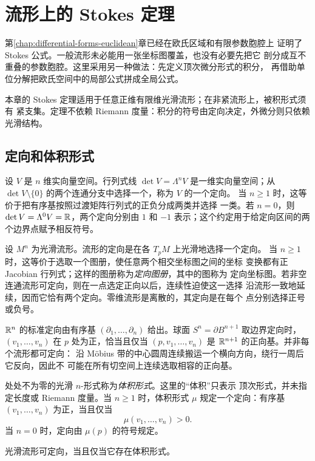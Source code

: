 \chapter{流形上的 Stokes 定理}
\label{chap:stokes-manifolds}

第\ref{chap:differential-forms-euclidean}章已经在欧氏区域和有限参数胞腔上
证明了 Stokes 公式。一般流形未必能用一张坐标图覆盖，也没有必要先把它
剖分成互不重叠的参数胞腔。这里采用另一种做法：先定义顶次微分形式的积分，
再借助单位分解把欧氏空间中的局部公式拼成全局公式。

本章的 Stokes 定理适用于任意正维有限维光滑流形；在非紧流形上，被积形式须有
紧支集。定理不依赖 Riemann 度量：积分的符号由定向决定，外微分则只依赖
光滑结构。

\section{定向和体积形式}

设 $V$ 是 $n$ 维实向量空间。行列式线
$\det V=\Lambda^nV$ 是一维实向量空间；从
$\det V\setminus\{0\}$ 的两个连通分支中选择一个，称为 $V$ 的一个定向。
当 $n\ge1$ 时，这等价于把有序基按照过渡矩阵行列式的正负分成两类并选择
一类。若 $n=0$，则 $\det V=\Lambda^0V=\mathbb{R}$，两个定向分别由 $1$ 和
$-1$ 表示；这个约定用于给定向区间的两个边界点赋予相反符号。

设 $M^n$ 为光滑流形。流形的定向是在各 $T_pM$ 上光滑地选择一个定向。
当 $n\ge1$ 时，这等价于选取一个图册，使任意两个相交坐标图之间的坐标
变换都有正 Jacobian 行列式；这样的图册称为\emph{定向图册}，其中的图称为
定向坐标图。若非空连通流形可定向，则在一点选定正向以后，连续性迫使这一选择
沿流形一致地延续，因而它恰有两个定向。零维流形是离散的，其定向是在每个
点分别选择正号或负号。

\(\mathbb{R}^n\) 的标准定向由有序基
\((\partial_1,\ldots,\partial_n)\) 给出。球面 \(S^n=\partial B^{n+1}\)
取边界定向时，\((v_1,\ldots,v_n)\) 在 \(p\) 处为正，恰当且仅当
\((p,v_1,\ldots,v_n)\) 是 \(\mathbb{R}^{n+1}\) 的正向基。并非每个流形都可定向：
沿 M\"obius 带的中心圆周连续搬运一个横向方向，绕行一周后它反向，因此不
可能在所有切空间上连续选取相容的正向基。

处处不为零的光滑 $n$-形式称为\emph{体积形式}。这里的“体积”只表示
顶次形式，并未指定长度或 Riemann 度量。当 $n\ge1$ 时，体积形式 $\mu$
规定一个定向：有序基 $(v_1,\ldots,v_n)$ 为正，当且仅当
\[
 \mu(v_1,\ldots,v_n)>0.
\]
当 $n=0$ 时，定向由 $\mu(p)$ 的符号规定。

\begin{theorem}\label{thm:orientation-volume-form}
光滑流形可定向，当且仅当它存在体积形式。
\end{theorem}

